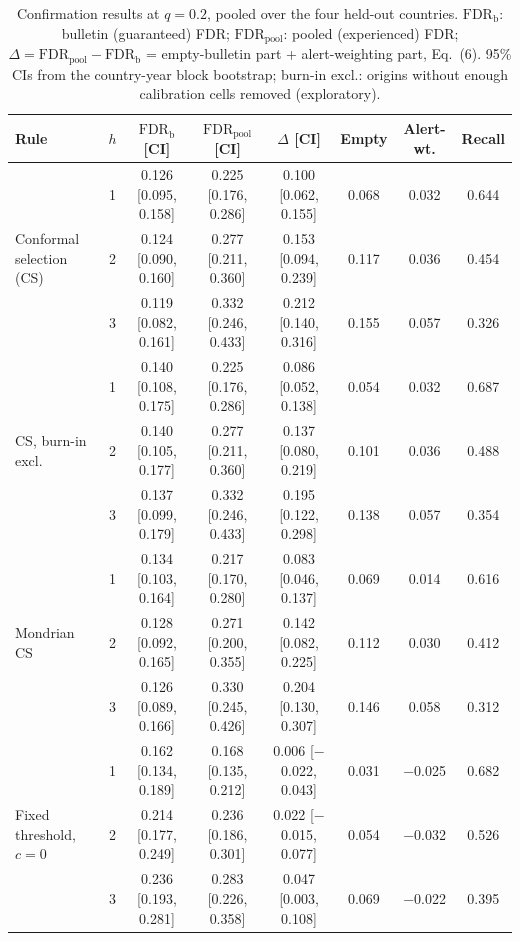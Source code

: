 \documentclass[runningheads]{llncs}
\newcommand{\FDRb}{\mathrm{FDR}_{\mathrm{b}}}
\newcommand{\FDRp}{\mathrm{FDR}_{\mathrm{pool}}}
\begin{document}
\begin{table}[!htbp]
\caption{Confirmation results at $q=0.2$, pooled over the four held-out countries. $\FDRb$: bulletin (guaranteed) FDR; $\FDRp$: pooled (experienced) FDR; $\Delta=\FDRp-\FDRb$ = empty-bulletin part + alert-weighting part, Eq.~(6). 95\% CIs from the country-year block bootstrap; burn-in excl.: origins without enough calibration cells removed (exploratory).}
\label{tab:main}
\centering
\scriptsize
\setlength{\tabcolsep}{2pt}
\begin{tabular}{@{}p{1.25cm}ccccccc@{}}
\toprule
Rule & $h$ & $\FDRb$ [CI] & $\FDRp$ [CI] & $\Delta$ [CI] & Empty & Alert-wt. & Recall \\
\midrule
\multirow{3}{1.25cm}{Conformal selection (CS)} & 1 & 0.126 [0.095, 0.158] & 0.225 [0.176, 0.286] & 0.100 [0.062, 0.155] & 0.068 & 0.032 & 0.644 \\
 & 2 & 0.124 [0.090, 0.160] & 0.277 [0.211, 0.360] & 0.153 [0.094, 0.239] & 0.117 & 0.036 & 0.454 \\
 & 3 & 0.119 [0.082, 0.161] & 0.332 [0.246, 0.433] & 0.212 [0.140, 0.316] & 0.155 & 0.057 & 0.326 \\
\midrule
\multirow{3}{1.25cm}{CS, burn-in excl.} & 1 & 0.140 [0.108, 0.175] & 0.225 [0.176, 0.286] & 0.086 [0.052, 0.138] & 0.054 & 0.032 & 0.687 \\
 & 2 & 0.140 [0.105, 0.177] & 0.277 [0.211, 0.360] & 0.137 [0.080, 0.219] & 0.101 & 0.036 & 0.488 \\
 & 3 & 0.137 [0.099, 0.179] & 0.332 [0.246, 0.433] & 0.195 [0.122, 0.298] & 0.138 & 0.057 & 0.354 \\
\midrule
\multirow{3}{1.25cm}{Mondrian CS} & 1 & 0.134 [0.103, 0.164] & 0.217 [0.170, 0.280] & 0.083 [0.046, 0.137] & 0.069 & 0.014 & 0.616 \\
 & 2 & 0.128 [0.092, 0.165] & 0.271 [0.200, 0.355] & 0.142 [0.082, 0.225] & 0.112 & 0.030 & 0.412 \\
 & 3 & 0.126 [0.089, 0.166] & 0.330 [0.245, 0.426] & 0.204 [0.130, 0.307] & 0.146 & 0.058 & 0.312 \\
\midrule
\multirow{3}{1.25cm}{Fixed threshold, $c=0$} & 1 & 0.162 [0.134, 0.189] & 0.168 [0.135, 0.212] & 0.006 [$-$0.022, 0.043] & 0.031 & $-$0.025 & 0.682 \\
 & 2 & 0.214 [0.177, 0.249] & 0.236 [0.186, 0.301] & 0.022 [$-$0.015, 0.077] & 0.054 & $-$0.032 & 0.526 \\
 & 3 & 0.236 [0.193, 0.281] & 0.283 [0.226, 0.358] & 0.047 [0.003, 0.108] & 0.069 & $-$0.022 & 0.395 \\
\bottomrule
\end{tabular}
\end{table}
\end{document}
